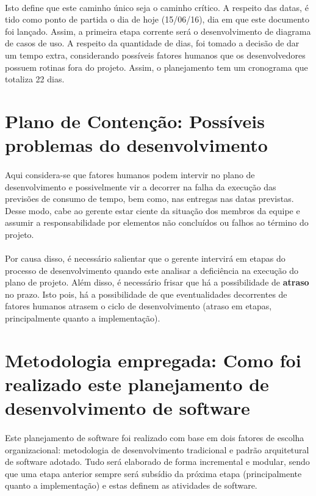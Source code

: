 \documentclass[12pt,a4paper]{article}
\begin{document}
		\paragraph{}Isto define que este caminho único seja o caminho crítico. A respeito das datas, é tido como ponto de partida o dia de hoje (15/06/16), dia em que este documento foi lançado. Assim, a primeira etapa corrente será o desenvolvimento de diagrama de casos de uso. A respeito da quantidade de dias, foi tomado a decisão de dar um tempo extra, considerando possíveis fatores humanos que os desenvolvedores possuem rotinas fora do projeto.  Assim, o planejamento tem um cronograma que totaliza 22 dias. 
		\section{Plano de Contenção: Possíveis problemas do desenvolvimento}
		\paragraph{} Aqui considera-se que fatores humanos podem intervir no plano de desenvolvimento e possivelmente vir a decorrer na falha da execução das previsões de consumo de tempo, bem como, nas entregas nas datas previstas. Desse modo, cabe ao gerente estar ciente da situação dos membros da equipe e assumir a responsabilidade por elementos não concluídos ou falhos ao término do projeto. 
		\paragraph{} Por causa disso, é necessário salientar que o gerente intervirá em etapas do processo de desenvolvimento quando este analisar a deficiência na execução do plano de projeto. Além disso, é necessário frisar que há a possibilidade de \textbf{atraso} no prazo. Isto pois, há a possibilidade de que eventualidades decorrentes de fatores humanos atrasem o ciclo de desenvolvimento (atraso em etapas, principalmente quanto a implementação).
		\section{Metodologia empregada: Como foi realizado este planejamento de desenvolvimento de software}
		\paragraph{}Este planejamento de software foi realizado com base em dois fatores de escolha organizacional: metodologia de desenvolvimento tradicional  e padrão arquitetural de software adotado. Tudo será elaborado de forma incremental e modular, sendo que uma etapa anterior sempre será subsídio da próxima etapa (principalmente quanto a implementação) e estas definem as atividades de software.
		
\end{document}
